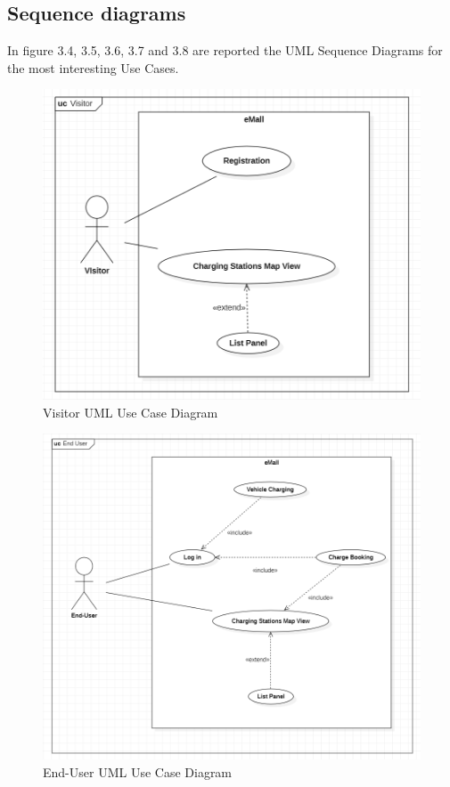 \documentclass[a4paper]{report}
\begin{document}
\subsection{Sequence diagrams }
In figure 3.4, 3.5, 3.6, 3.7 and 3.8 are reported the UML Sequence Diagrams for the most interesting Use Cases.
\begin{figure}[p]
\includegraphics[width=\textwidth]{RASD/img/UC_Visitor}
\caption{Visitor UML Use Case Diagram}
\label{fig:class-diagramRASD}
\end{figure}
\restoregeometry

\begin{figure}[p]
\includegraphics[width=\textwidth]{RASD/img/UC_EndUser.png}
\caption{End-User UML Use Case Diagram}
\label{fig:class-diagramRASD}
\end{figure}
\end{document}
